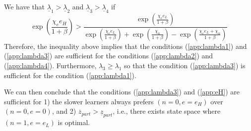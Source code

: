 \documentclass[12pt,english]{article}
\numberwithin{equation}{section}
\begin{document}
{We have that $\underline{\lambda}_1>\underline{\lambda}_2$ and $\underline{\lambda}_3>\underline{\lambda}_4$ if 
\begin{equation} \label{app:eH}
    \exp(\frac{\chi_e e_H}{1+\beta})>\frac{\exp(\frac{\chi_e e_L}{1+\beta})}{\exp(\frac{\chi_e e_L}{1+\beta})+\exp(\frac{\chi_n}{1+\beta})-\exp(\frac{\chi_e e_L + \chi_n}{1+\beta})}
\end{equation}
Therefore, the inequality above implies that the conditions (\ref{app:lambda1}) and (\ref{app:lambda3}) are sufficient for the conditions (\ref{app:lambda2}) and (\ref{app:lambda4}). Furthermore, $\lambda_3 \geq \lambda_1$ so that the condition (\ref{app:lambda3}) is sufficient for the condition (\ref{app:lambda1}). 

We can then conclude that the conditions (\ref{app:lambda3}) and (\ref{app:eH}) are sufficient for 1) the slower learners always prefers $(n=0,e=e_H)$ over $(n=0,e=0)$, and 2) $\overline{z}_{part}>\underline{z}_{part}$, i.e., there exists state space where $(n=1,e=e_L)$ is optimal.


}
\end{document}
